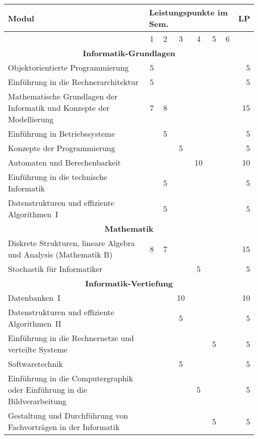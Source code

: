 \begin{table}[tbp]
    \begin{small}
    \begin{tabularx}{\textwidth}{|X||c|c|c|c|c|c||r|}
        \hline
        \textbf{Modul}&\multicolumn{6}{l||}{\textbf{Leistungspunkte im Sem.}}&\textbf{LP}\\\hline
        &1&2&3&4&5&6&\\\hline\hline
        \multicolumn{8}{|c|}{\textbf{Informatik-Grundlagen}}\\\hline
        Objektorientierte Programmierung&5&&&&&&5\\\hline
        Einführung in die Rechnerarchitektur&5&&&&&&5\\\hline
        Mathematische Grundlagen der Informatik und Konzepte der Modellierung &7&8&&&&&15\\\hline
        Einführung in Betriebssysteme&&5&&&&&5\\\hline
        Konzepte der Programmierung&&&5&&&&5\\\hline
        Automaten und Berechenbarkeit&&&&10&&&10\\\hline
        Einführung in die technische Informatik&&5&&&&&5\\\hline
        Datenstrukturen und effiziente Algorithmen~I&&5&&&&&5\\\hline\hline
        \multicolumn{8}{|c|}{\textbf{Mathematik}}\\\hline
        Diskrete Strukturen, lineare Algebra und Analysis (Mathematik B)&8&7&&&&&15\\\hline
        Stochastik für Informatiker&&&&5&&&5\\\hline\hline
        \multicolumn{8}{|c|}{\textbf{Informatik-Vertiefung}}\\\hline
        Datenbanken~I&&&10&&&&10\\\hline
        Datenstrukturen und effiziente Algorithmen~II&&&5&&&&5\\\hline
        Einführung in die Rechnernetze und verteilte Systeme&&&&&5&&5\\\hline
        Softwaretechnik&&&5&&&&5\\\hline
        Einführung in die Computergraphik oder Einführung in die Bildverarbeitung&&&&5&&&5\\\hline
        Gestaltung und Durchführung von Fachvorträgen in der Informatik&&&&&5&&5\\\hline

\end{tabularx}
\end{small}
\end{table}
